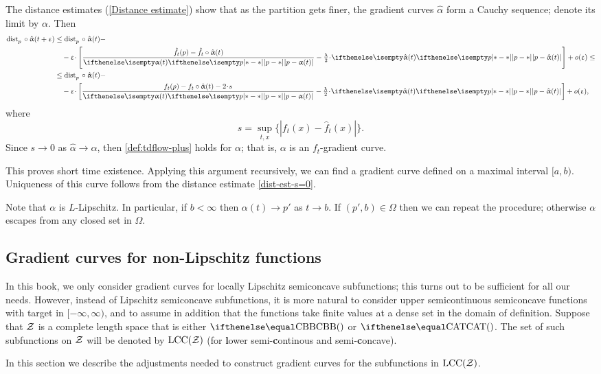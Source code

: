 The distance estimates (\ref{Distance estimate}) show that as the partition gets finer, the gradient curves $\hat\alpha$ form a Cauchy sequence; denote its limit by $\alpha$.
Then
\begin{align*}
\distfun{p}{}{}\circ\hat\alpha(t+\eps)
&\le 
\distfun{p}{}{}\circ\hat\alpha(t)-
\\
&\quad
-\eps\cdot \left[\frac{\hat f_t(p)-\hat f_t\circ\hat\alpha(t)}{\dist{p}{\alpha(t)}{}}-\tfrac\lambda2\cdot \dist{p}{\hat\alpha(t)}{}\right] 
+o(\eps)\le
\\
&\le 
\distfun{p}{}{}\circ\hat\alpha(t)-
\\
&\quad
-\eps\cdot \left[\frac{f_t(p)-f_t\circ\hat\alpha(t)-2\cdot s}{\dist{p}{\alpha(t)}{}}-\tfrac\lambda2\cdot \dist{p}{\hat\alpha(t)}{}\right]
+o(\eps),
\end{align*}
where 
\[s=\sup_{t,x} \{|f_t(x)-\hat f_t(x)|\}.\]
Since $s\to 0$ as $\hat\alpha\to \alpha$, then \ref{def:tdflow-plus} holds for $\alpha$;
that is, $\alpha$ is an $f_t$-gradient curve.

This proves short time existence.
Applying this argument recursively, we can find a gradient curve defined on a maximal interval $[a,b)$.
Uniqueness of this curve follows from the distance estimate \ref{dist-est-s=0}. 

Note that $\alpha$ is $L$-Lipschitz.
In particular, if $b<\infty$ then $\alpha(t)\to p'$ as $t\to b$.
If $(p',b)\in \Omega$ then we can repeat the procedure; otherwise $\alpha$ escapes from any closed set in $\Omega$. 
\qeds

\subsection*{Gradient curves for non-Lipschitz functions}\label{sec:non-lip}

In this book, we only consider gradient curves for locally Lipschitz semiconcave subfunctions;
this turns out to be sufficient for all our needs.
However, 
instead of Lipschitz semiconcave subfunctions,
it is more natural to consider upper semicontinuous semiconcave functions
with target in $[-\infty,\infty)$,
and to assume in addition that 
the functions take finite values at a dense set in the domain of definition.
Suppose that $\mathcal{Z}$ is a complete length space that is either $\Alex{}$ or $\CAT{}$.
The set of such subfunctions on $\mathcal{Z}$ will be denoted by 
$\mathrm{LCC}(\mathcal{Z})$ (for \textbf{l}ower semi-\textbf{c}ontinous and semi-\textbf{c}oncave).

In this section we describe the adjustments needed
to construct gradient curves for the subfunctions in $\mathrm{LCC}(\mathcal{Z})$.

